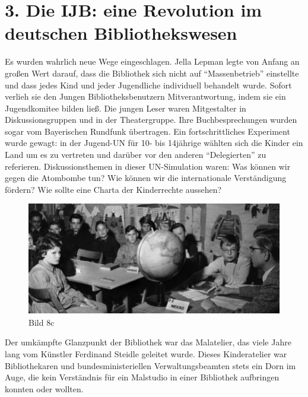 \documentclass[a4paper,
fontsize=11pt,
oneside,
numbers=noperiodatend,
parskip=half-,
bibliography=totoc,
final
]{scrartcl}
\begin{document}
\section*{3. Die IJB: eine Revolution im deutschen
Bibliothekswesen}\label{die-ijb-eine-revolution-im-deutschen-bibliothekswesen}

Es wurden wahrlich neue Wege eingeschlagen. Jella Lepman legte von
Anfang an großen Wert darauf, dass die Bibliothek sich nicht auf
\enquote{Massenbetrieb} einstellte und dass jedes Kind und jeder
Jugendliche individuell behandelt wurde. Sofort verlieh sie den Jungen
Bibliotheksbenutzern Mitverantwortung, indem sie ein Jugendkomitee
bilden ließ. Die jungen Leser waren Mitgestalter in Diskussionsgruppen
und in der Theatergruppe. Ihre Buchbesprechungen wurden sogar vom
Bayerischen Rundfunk übertragen. Ein fortschrittliches Experiment wurde
gewagt: in der Jugend-UN für 10- bis 14jährige wählten sich die Kinder
ein Land um es zu vertreten und darüber vor den anderen
\enquote{Delegierten} zu referieren. Diskussionsthemen in dieser
UN-Simulation waren: Was können wir gegen die Atombombe tun? Wie können
wir die internationale Verständigung fördern? Wie sollte eine Charta der
Kinderrechte aussehen?

\begin{figure}[htbp]
\centering
\includegraphics{img/Bild8c.jpg}
\caption{Bild 8c}
\end{figure}

Der umkämpfte Glanzpunkt der Bibliothek war das Malatelier, das viele
Jahre lang vom Künstler Ferdinand Steidle geleitet wurde. Dieses
Kinderatelier war Bibliothekaren und bundesministeriellen
Verwaltungsbeamten stets ein Dorn im Auge, die kein Verständnis für ein
Malstudio in einer Bibliothek aufbringen konnten oder wollten.
\end{document}
